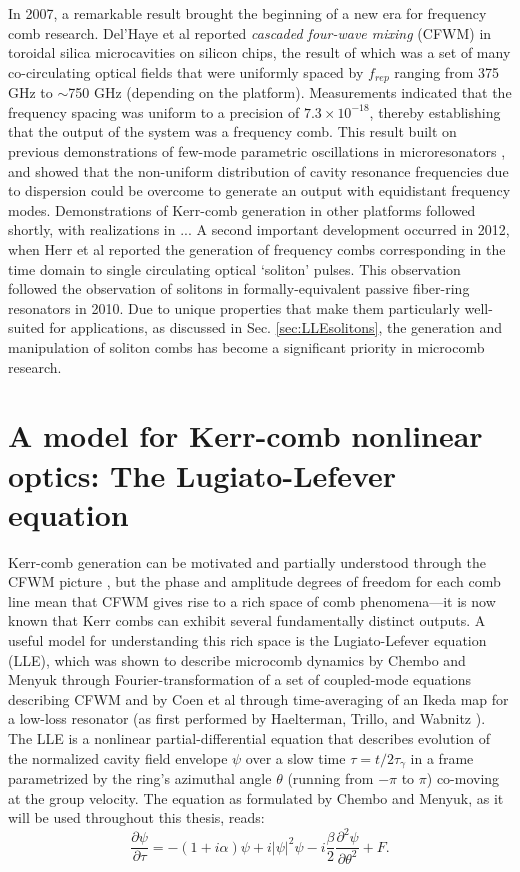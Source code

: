 In 2007, a remarkable result brought the beginning of a new era for frequency comb research. Del'Haye et al reported \textit{cascaded four-wave mixing} (CFWM) in toroidal silica microcavities on silicon chips, the result of which was a set of many co-circulating optical fields that were uniformly spaced by $f_{rep}$ ranging from 375 GHz to $\sim$750 GHz (depending on the platform)\cite{DelHaye2007}. Measurements indicated that the frequency spacing was uniform to a precision of $7.3 \times 10^{-18}$, thereby establishing that the output of the system was a frequency comb. This result built on previous demonstrations of few-mode parametric oscillations in microresonators \cite{Kippenberg2004, Savchenkov2004,Agha2007}, and showed that the non-uniform distribution of cavity resonance frequencies due to dispersion could be overcome to generate an output with equidistant frequency modes. Demonstrations of Kerr-comb generation in other platforms followed shortly, with realizations in ... A second important development occurred in 2012, when Herr et al reported the generation of frequency combs corresponding in the time domain to single circulating optical `soliton' pulses. This observation followed the observation of solitons in formally-equivalent passive fiber-ring resonators in 2010\cite{Leo2010a}. Due to unique properties that make them particularly well-suited for applications, as discussed in Sec. \ref{sec:LLEsolitons}, the generation and manipulation of soliton combs has become a significant priority in microcomb research. 

\section{A model for Kerr-comb nonlinear optics: The Lugiato-Lefever equation}

Kerr-comb generation can be motivated and partially understood through the CFWM picture \cite{Herr2012}, but the phase and amplitude degrees of freedom for each comb line mean that CFWM gives rise to a rich space of comb phenomena---it is now known that Kerr combs can exhibit several fundamentally distinct outputs.  A useful model for understanding this rich space is the Lugiato-Lefever equation (LLE), which was shown to describe microcomb dynamics by Chembo and Menyuk \cite{Chembo2013} through Fourier-transformation of a set of coupled-mode equations describing CFWM and by Coen et al \cite{Coen2013a} through time-averaging of an Ikeda map for a low-loss resonator (as first performed by Haelterman, Trillo, and Wabnitz \cite{Haelterman1992a}).  The LLE is a nonlinear partial-differential equation that describes evolution of the normalized cavity field envelope $\psi$ over a slow time $\tau=t/2\tau_\gamma$ in a frame parametrized by the ring's azimuthal angle $\theta$ (running from $-\pi$ to $\pi$) co-moving at the group velocity. The equation as formulated by Chembo and Menyuk, as it will be used throughout this thesis, reads:
\begin{equation}
\frac{\partial \psi}{\partial \tau}=-(1+i \alpha) \psi + i|\psi|^2 \psi -i \frac{\beta}{2} \frac{\partial^2 \psi}{\partial \theta^2} +F. \label{eq:LLE}
\end{equation}

